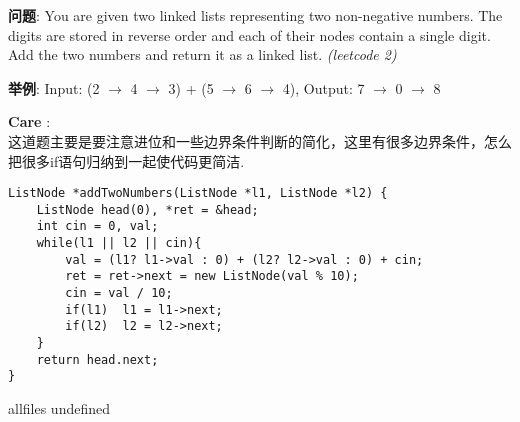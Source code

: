 \documentclass{article}
\begin{document}
\begin{CJK}{UTF8}{gbsn}     %

\else
    
\begin{description}
    \item{\textbf{问题}}: You are given two linked lists representing two non-negative numbers. The digits are stored in reverse order and each of their nodes contain a single digit. Add the two numbers and return it as a linked list. \textit{(leetcode 2)}
	\item{\textbf{举例}}: Input: (2 $\rightarrow$ 4 $\rightarrow$ 3) + (5 $\rightarrow$ 6 $\rightarrow$ 4), Output: 7 $\rightarrow$ 0 $\rightarrow$ 8
    \item{\textbf{Care}} : 
    \\这道题主要是要注意进位和一些边界条件判断的简化，这里有很多边界条件，怎么把很多if语句归纳到一起使代码更简洁.
    \begin{lstlisting}
ListNode *addTwoNumbers(ListNode *l1, ListNode *l2) {
	ListNode head(0), *ret = &head;
	int cin = 0, val;
	while(l1 || l2 || cin){
		val = (l1? l1->val : 0) + (l2? l2->val : 0) + cin;
		ret = ret->next = new ListNode(val % 10);
		cin = val / 10;
		if(l1)	l1 = l1->next;
		if(l2)	l2 = l2->next;
	}
	return head.next;
}
    \end{lstlisting}
\end{description}

\fi

\ifx allfiles undefined
\end{CJK}
\end{document}
